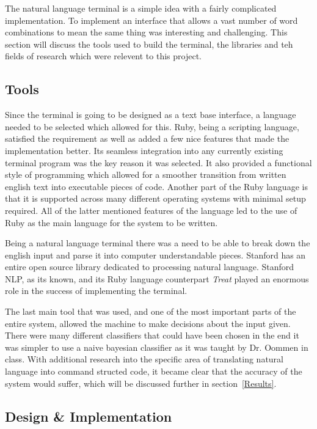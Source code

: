 \documentclass[12pt]{article}
\begin{document}
The natural language terminal is a simple idea with a fairly complicated implementation. To implement an interface that allows a vast number of word combinations to mean the same thing was interesting and challenging. This section will discuss the tools used to build the terminal, the libraries and teh fields of research which were relevent to this project.

\subsection{Tools}

Since the terminal is going to be designed as a text base interface, a language needed to be selected which allowed for this. Ruby, being a scripting language, satisfied the requirement as well as added a few nice features that made the implementation better. Its seamless integration into any currently existing terminal program was the key reason it was selected. It also provided a functional style of programming which allowed for a smoother transition from written english text into executable pieces of code.\cite{matuszek} Another part of the Ruby language is that it is supported across many different operating systems with minimal setup required. All of the latter mentioned features of the language led to the use of Ruby as the main language for the system to be written.

Being a natural language terminal there was a need to be able to break down the english input and parse it into computer understandable pieces. Stanford has an entire open source library dedicated to processing natural language. Stanford NLP, as its known, and its Ruby language counterpart {\it Treat} played an enormous role in the success of implementing the terminal.

The last main tool that was used, and one of the most important parts of the entire system, allowed the machine to make decisions about the input given. There were many different classifiers that could have been chosen in the end it was simpler to use a naive bayesian classifier as it was taught by Dr. Oommen in class. With additional research into the specific area of translating natural language into command structed code\cite{matuszek}, it became clear that the accuracy of the system would suffer, which will be discussed further in section~\ref{Results}.

\subsection{Design & Implementation}
\end{document}
